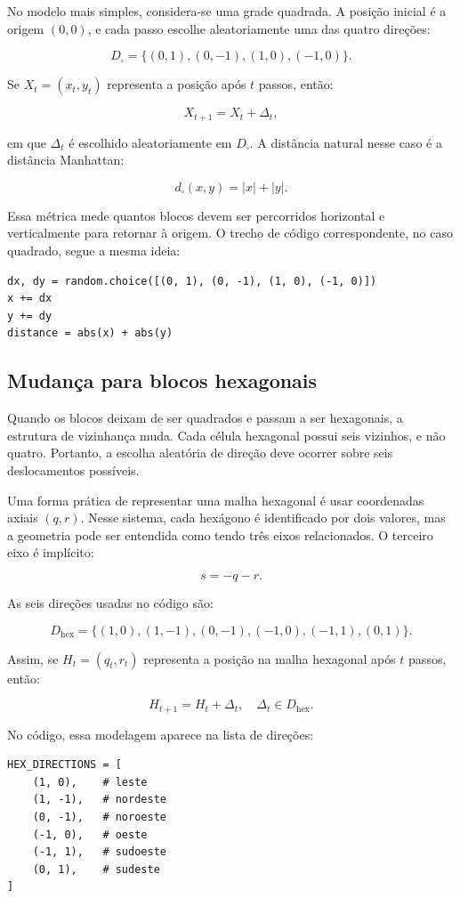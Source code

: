 \documentclass[12pt,a4paper]{article}
\begin{document}
No modelo mais simples, considera-se uma grade quadrada. A posição inicial é a origem $(0,0)$, e cada passo escolhe aleatoriamente uma das quatro direções:

\[
D_{\square}=\{(0,1),(0,-1),(1,0),(-1,0)\}.
\]

Se $X_t=(x_t,y_t)$ representa a posição após $t$ passos, então:

\[
X_{t+1}=X_t+\Delta_t,
\]

em que $\Delta_t$ é escolhido aleatoriamente em $D_{\square}$. A distância natural nesse caso é a distância Manhattan:

\[
d_{\square}(x,y)=|x|+|y|.
\]

Essa métrica mede quantos blocos devem ser percorridos horizontal e verticalmente para retornar à origem. O trecho de código correspondente, no caso quadrado, segue a mesma ideia:

\begin{lstlisting}
dx, dy = random.choice([(0, 1), (0, -1), (1, 0), (-1, 0)])
x += dx
y += dy
distance = abs(x) + abs(y)
\end{lstlisting}

\subsection{Mudança para blocos hexagonais}

Quando os blocos deixam de ser quadrados e passam a ser hexagonais, a estrutura de vizinhança muda. Cada célula hexagonal possui seis vizinhos, e não quatro. Portanto, a escolha aleatória de direção deve ocorrer sobre seis deslocamentos possíveis.

Uma forma prática de representar uma malha hexagonal é usar coordenadas axiais $(q,r)$. Nesse sistema, cada hexágono é identificado por dois valores, mas a geometria pode ser entendida como tendo três eixos relacionados. O terceiro eixo é implícito:

\[
s=-q-r.
\]

As seis direções usadas no código são:

\[
D_{\mathrm{hex}}=\{(1,0),(1,-1),(0,-1),(-1,0),(-1,1),(0,1)\}.
\]

Assim, se $H_t=(q_t,r_t)$ representa a posição na malha hexagonal após $t$ passos, então:

\[
H_{t+1}=H_t+\Delta_t,\quad \Delta_t\in D_{\mathrm{hex}}.
\]

No código, essa modelagem aparece na lista de direções:

\begin{lstlisting}
HEX_DIRECTIONS = [
    (1, 0),    # leste
    (1, -1),   # nordeste
    (0, -1),   # noroeste
    (-1, 0),   # oeste
    (-1, 1),   # sudoeste
    (0, 1),    # sudeste
]
\end{lstlisting}
\end{document}
